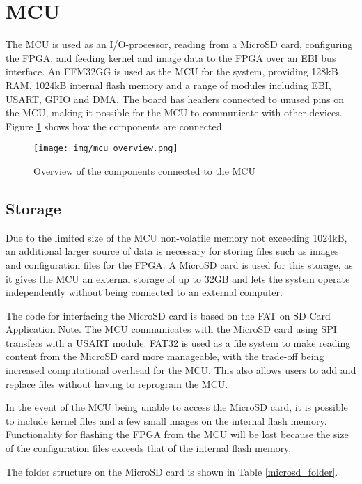 \section{MCU}

The MCU is used as an I/O-processor, reading from a MicroSD card, configuring the FPGA, and feeding kernel and image data to the FPGA over an EBI bus interface. An EFM32GG is used as the MCU for the system, providing 128kB RAM, 1024kB internal flash memory and a range of modules including EBI, USART, GPIO and DMA. The board has headers connected to unused pins on the MCU, making it possible for the MCU to communicate with other devices. Figure \ref{fig:mcuOverview} shows how the components are connected.

\begin{figure}[h!]
    \texttt{[image: img/mcu\_overview.png]}
    \caption{Overview of the components connected to the MCU}
    \label{fig:mcuOverview}
\end{figure}

\subsection{Storage}
Due to the limited size of the MCU non-volatile memory not exceeding 1024kB, an additional larger source of data is necessary for storing files such as images and configuration files for the FPGA. A MicroSD card is used for this storage, as it gives the MCU an external storage of up to 32GB and lets the system operate independently without being connected to an external computer.

The code for interfacing the MicroSD card is based on the FAT on SD Card Application Note\cite{an0030}. The MCU communicates with the MicroSD card using SPI transfers with a USART module. FAT32 is used as a file system to make reading content from the MicroSD card more manageable, with the trade-off being increased computational overhead for the MCU. This also allows users to add and replace files without having to reprogram the MCU.

In the event of the MCU being unable to access the MicroSD card, it is possible to include kernel files and a few small images on the internal flash memory. Functionality for flashing the FPGA from the MCU will be lost because the size of the configuration files exceeds that of the internal flash memory.

The folder structure on the MicroSD card is shown in Table \ref{microsd_folder}.

